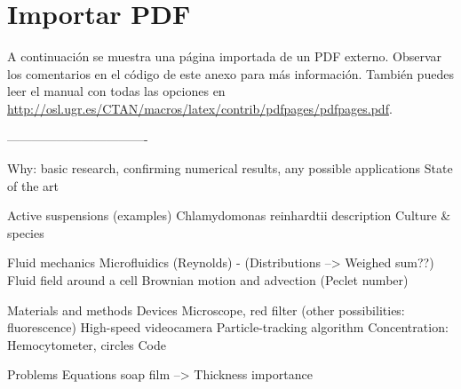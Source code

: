 
\chapter{Importar PDF}

A continuación se muestra una página importada de un PDF externo. Observar los comentarios en el código de este anexo para más información. También puedes leer el manual con todas las opciones en \url{http://osl.ugr.es/CTAN/macros/latex/contrib/pdfpages/pdfpages.pdf}.

%






----------------------------------

Why: basic research, confirming numerical results, any possible applications
State of the art

Active suspensions (examples)
Chlamydomonas reinhardtii description
Culture \& species

Fluid mechanics
Microfluidics (Reynolds) - (Distributions --> Weighed sum??)
Fluid field around a cell 
Brownian motion and advection (Peclet number)

Materials and methods
Devices
Microscope, red filter (other possibilities: fluorescence)
High-speed videocamera
Particle-tracking algorithm
Concentration: Hemocytometer, circles
Code

Problems
Equations soap film --> Thickness importance
